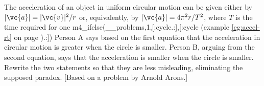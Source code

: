  The acceleration of an object in uniform circular motion
can be given either by $|\vc{a}|=|\vc{v}|^2/r$ or, equivalently, by
$|\vc{a}|=4\pi^2r/T^2$, where $T$ is the time required for one
m4_ifelse(__problems,1,[:cycle.:],[:cycle (example \ref{eg:accel-rt} on page \pageref{eg:accel-rt}).:])
Person A says based on the first equation that
the acceleration in circular motion is greater when the
circle is smaller. Person B, arguing from the second
equation, says that the acceleration is smaller when the
circle is smaller. Rewrite the two statements so that they
are less misleading, eliminating the supposed paradox.
[Based on a problem by Arnold Arons.]
